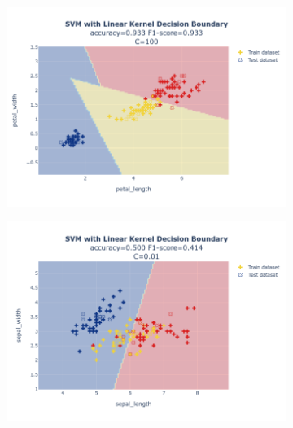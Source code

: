 \documentclass{article}
\begin{document}
\begin{figure}
\begin{subfigure}{0.3\textwidth}
        \includegraphics[scale=.13]{images/implementation/q1/linear_kernel/petal_length_petal_width_100.png}
    \end{subfigure}
    \hfill
    \begin{subfigure}{0.3\textwidth}
        \centering
        \includegraphics[scale=.13]{images/implementation/q1/linear_kernel/sepal_length_sepal_width_0.01.png}
    \end{subfigure}
    \newline
    \begin{subfigure}{0.3\textwidth}
        \centering

\end{subfigure}
\end{figure}
\end{document}
